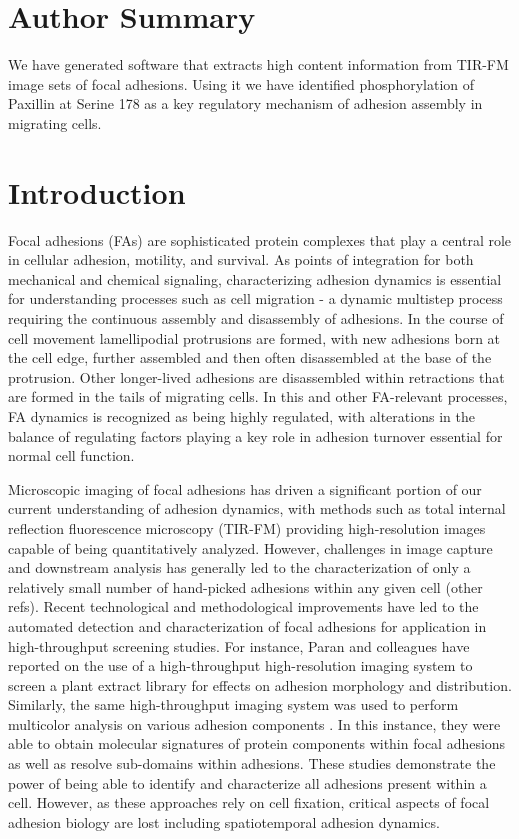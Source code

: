 \documentclass[10pt]{article}
\begin{document}

\section*{Author Summary}

We have generated software that extracts high content information from TIR-FM
image sets of focal adhesions.  Using it we have identified phosphorylation of
Paxillin at Serine 178 as a key regulatory mechanism of adhesion assembly in
migrating cells.

\section*{Introduction}

Focal adhesions (FAs) are sophisticated protein complexes that play a central
role in cellular adhesion, motility, and survival. As points of integration for
both mechanical and chemical signaling, characterizing adhesion dynamics is
essential for understanding processes such as cell migration - a dynamic
multistep process requiring the continuous assembly and disassembly of
adhesions. In the course of cell movement lamellipodial protrusions are formed,
with new adhesions born at the cell edge, further assembled and then often
disassembled at the base of the protrusion. Other longer-lived adhesions are
disassembled within retractions that are formed in the tails of migrating cells.
In this and other FA-relevant processes, FA dynamics is recognized as being
highly regulated, with alterations in the balance of regulating factors playing
a key role in adhesion turnover essential for normal cell function.

Microscopic imaging of focal adhesions has driven a significant portion of our
current understanding of adhesion dynamics, with methods such as total internal
reflection fluorescence microscopy (TIR-FM) providing high-resolution images
capable of being quantitatively analyzed. However, challenges in image capture
and downstream analysis has generally led to the characterization of only a
relatively small number of hand-picked adhesions within any given cell
\cite{Webb2004} (other refs). Recent technological and methodological
improvements have led to the automated detection and characterization of focal
adhesions for application in high-throughput screening studies. For instance,
Paran and colleagues have reported on the use of a high-throughput
high-resolution imaging system to screen a plant extract library for effects on
adhesion morphology and distribution. Similarly, the same high-throughput
imaging system was used to perform multicolor analysis on various adhesion
components \cite{Zamir2008}. In this instance, they were able to obtain
molecular signatures of protein components within focal adhesions as well as
resolve sub-domains within adhesions. These studies demonstrate the power of
being able to identify and characterize all adhesions present within a cell.
However, as these approaches rely on cell fixation, critical aspects of focal
adhesion biology are lost including spatiotemporal adhesion dynamics.
\end{document}
